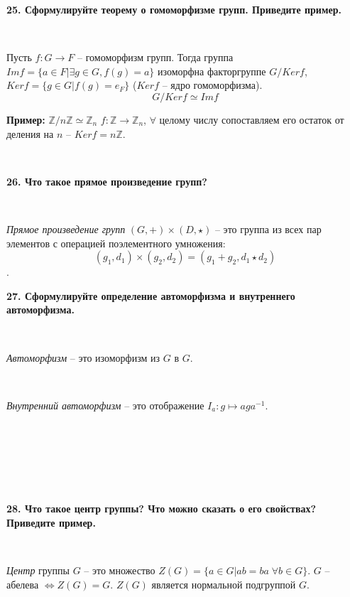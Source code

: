 \documentclass{article}
\begin{document}
    \textbf{25. Сформулируйте теорему о гомоморфизме групп. Приведите пример.}

    {
        $\;$
        \setlength{\parindent}{0.4cm}
        \hangindent=0.4cm

    Пусть $f:G\rightarrow F$ -- гомоморфизм групп. Тогда группа $Im f =\{a\in F|\exists g\in G, f(g)=a \}$ изоморфна факторгруппе $G/Ker f$, $Ker f=\{g\in G|f(g)=e_F \}$ ($Ker f$ -- ядро гомоморфизма).
        $$G/Ker f\simeq Im f$$

        \textbf{Пример:} $\mathbb{Z}/n\mathbb{Z}\simeq\mathbb{Z}_n$ $f:\mathbb{Z}\rightarrow\mathbb{Z}_n$, $\forall$ целому числу сопоставляем его остаток от деления на $n$ -- $Ker f=n\mathbb{Z}$.

        $\;$
        \setlength{\parindent}{0cm}
        \hangindent=0cm
    }

    \textbf{26. Что такое прямое произведение групп?}

    {
        $\;$
        \setlength{\parindent}{0.4cm}
        \hangindent=0.4cm

    \textit{Прямое произведение групп} $(G, +)\times(D, \star)$ -- это группа из всех пар элементов с операцией поэлементного умножения: $$(g_1, d_1)\times(g_2, d_2)=(g_1+g_2, d_1\star d_2)$$.
        $\;$
        \setlength{\parindent}{0cm}
        \hangindent=0cm
    }

    \textbf{27. Сформулируйте определение автоморфизма и внутреннего автоморфизма.}

    {
        $\;$
        \setlength{\parindent}{0.4cm}
        \hangindent=0.4cm

    \textit{Автоморфизм} -- это изоморфизм из $G$ в $G$.

        $\;$

        \textit{Внутренний автоморфизм} -- это отображение $I_a:g\mapsto aga^{-1}$.

        $\;$
        \setlength{\parindent}{0cm}
        \hangindent=0cm
    }
    \textbf{}\\
    \textbf{}\\
    \textbf{}\\
    \textbf{}\\
    \textbf{28. Что такое центр группы? Что можно сказать о его свойствах? Приведите пример.}

    {
        $\;$
        \setlength{\parindent}{0.4cm}
        \hangindent=0.4cm

    \textit{Центр} группы $G$ -- это множество $Z(G)=\{a\in G|ab=ba\;\forall b\in G \}$. $G$ -- абелева $\Leftrightarrow Z(G)=G$. $Z(G)$ является нормальной подгруппой $G$.

        $\;$
        \setlength{\parindent}{0cm}
        \hangindent=0cm
    }
\end{document}
